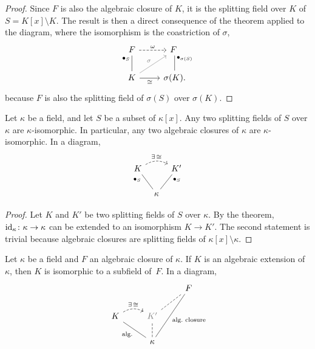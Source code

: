 \begin{proof}
    Since $F$ is also the algebraic closure of $K$, it is the splitting field over $K$ of $S=K[x]\setminus K$. The result is then a direct consequence of the theorem applied to the diagram, where the isomorphism is the coastriction of $\sigma$,
    $$
        \begin{tikzcd}
            F
                    \arrow[r,"\omega",dashed]
                &F\hphantom.\\
            K
                    \arrow[r,"\cong"']
                    \arrow[u,"\sfld_S",no head,pos=0.8]
                    \arrow[ur,"\sigma",color=gray]
                &\sigma(K).
                    \arrow[u,"\sfld_{\sigma(S)}"',no head,pos=0.8]
        \end{tikzcd}
    $$
    because $F$ is also the splitting field of $\sigma(S)$ over $\sigma(K)$.
\end{proof}

\begin{cor}\label{cor:isomorphic-split-fields}
    Let\/ $\kappa$ be a field, and let\/ $S$ be a subset of\/ $\kappa[x]$. Any two splitting fields of\/ $S$ over\/ $\kappa$ are\/ $\kappa$-isomorphic. In particular, any two algebraic closures of\/ $\kappa$ are\/ $\kappa$-isomorphic. In a diagram,
    $$
\begin{tikzcd}[column sep=tiny]
    K
            \arrow[rr,"{\exists\,\cong}",dashed,bend left]
        &&K'\\
        &\kappa
            \arrow[lu,"\sfld_S",no head,pos=0.9]
            \arrow[ru,"\sfld_S"',no head,pos=0.9]
\end{tikzcd}
    $$
\end{cor}

\begin{proof}
    Let $K$  and $K'$ be two splitting fields of $S$ over $\kappa$. By the theorem, $\operatorname{id}_\kappa\colon\kappa\to\kappa$ can be extended to an isomorphism $K\to K'$. The second statement is trivial because algebraic closures are splitting fields of $\kappa[x]\setminus\kappa$.
\end{proof}

\begin{cor}\label{cor:alg.closures-swalows-alg.}
    Let\/ $\kappa$ be a field and\/ $F$ an algebraic closure of\/ $\kappa$. If\/ $K$ is an algebraic extension of\/ $\kappa$, then\/ $K$ is isomorphic to a subfield of\/~$F$. In a diagram,
    $$
        \begin{tikzcd}
                &&F\\
            K
                    \arrow[r,"\exists\,\cong",dashed,bend left]
                &\textcolor{gray}{K'}
                    \arrow[ru,no head,dashed]\\
                &\kappa
                    \arrow[lu,"\text{\rm alg.}",no head]
                    \arrow[u,no head,dashed]
                    \arrow[ruu,"\text{\rm alg.~closure}"',no head]
        \end{tikzcd}
    $$
\end{cor}

